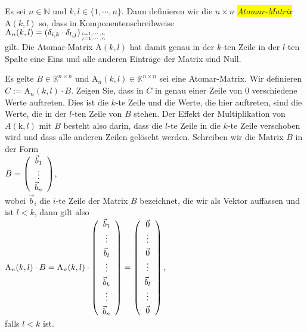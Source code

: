 \begin{Definition}
  Es sei $n\in\mathbb{N}$ und $k,l \in \{1,\cdots,n\}$.  Dann 
  definieren wir die $n \times n$ \colorbox{yellow}{\emph{Atomar-Matrix}} $\mathrm{A}(k,l)$ so, dass in Komponentenschreibweise
  \\[0.2cm]
  \hspace*{1.3cm}
  $\mathrm{A}_n(k,l) = (\delta_{i,k} \cdot \delta_{l,j})_{{i = 1, \cdots, n} \atop {j = 1, \cdots, n}}$
  \\[0.2cm]
  gilt.  Die Atomar-Matrix $\mathrm{A}(k,l)$ hat damit genau in der $k$-ten Zeile in der $l$-ten Spalte eine
  Eins und alle anderen Eintr\"{a}ge der Matrix sind Null.  \eoxs
\end{Definition}

\exercise
Es gelte $B \in \mathbb{K}^{n \times n}$ und $\mathrm{A}_n(k,l) \in \mathbb{K}^{n \times n}$ sei eine Atomar-Matrix.  
Wir definieren $C := \mathrm{A}_n(k,l) \cdot B$.  Zeigen Sie, dass in $C$ in genau einer Zeile von $0$ verschiedene
Werte auftreten.  Dies ist die $k$-te Zeile und die Werte, die hier auftreten, sind die Werte, die in
der $l$-ten Zeile von $B$ stehen.   Der Effekt der Multiplikation von $A(\mathrm{k},l)$ mit $B$ besteht also darin,
dass die $l$-te Zeile in die $k$-te Zeile verschoben wird und dass alle anderen Zeilen gel\"{o}scht
werden.  Schreiben wir die Matrix $B$ in der Form
\\[0.2cm]
\hspace*{1.3cm}
$B = \left(
  \begin{array}[c]{c}
    \vec{b}_1 \\
    \vdots       \\
    \vec{b}_n 
  \end{array} 
\right)
$, 
\\[0.2cm]
wobei $\vec{b}_i$ die $i$-te Zeile der Matrix $B$ bezeichnet, die wir als Vektor auffassen und
ist $l < k$, dann gilt also
\\[0.2cm]
\hspace*{1.3cm}
$\mathrm{A}_n(k,l) \cdot B = \mathrm{A}_n(k,l) \cdot \left(
  \begin{array}[c]{c}
    \vec{b}_1 \\
    \vdots       \\[0.1cm]
    \vec{b}_l \\
    \vdots       \\[0.1cm]
    \vec{b}_k \\
    \vdots       \\[0.1cm]
    \vec{b}_n 
  \end{array}
\right) = \left(
  \begin{array}[c]{c}
    \vec{0} \\
    \vdots       \\[0.1cm]
    \vec{0}   \\
    \vdots       \\[0.1cm]
    \vec{b}_l \\
    \vdots       \\[0.1cm]
    \vec{0} 
  \end{array}
\right),
$
\\[0.2cm]
falls $l < k$ ist.
\eox

